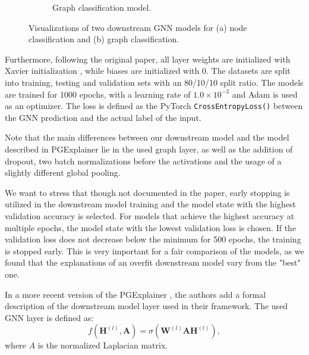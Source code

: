 \begin{figure}[htbp]
\begin{subfigure}[t]{0.48\textwidth}
\begin{tikzpicture}
        \end{tikzpicture}
        \caption{Graph classification model.}
        \label{fig:graph-classification}
    \end{subfigure}
    \caption{Visualizations of two downstream GNN models for (a) node classification and (b) graph classification.}
    \label{fig:gnn-models}
\end{figure}

Furthermore, following the original paper, all layer weights are initialized with Xavier initialization \cite{glorot2010understanding}, while biases are initialized with $0$. The datasets are split into training, testing and validation sets with an 80/10/10 split ratio. The models are trained for 1000 epochs, with a learning rate of $1.0 \times 10^{-3}$ and Adam \cite{kingma2014adam} is used as an optimizer. The loss is defined as the PyTorch \lstinline|CrossEntropyLoss()| between the GNN prediction and the actual label of the input. \bigskip

Note that the main differences between our downstream model and the model described in PGExplainer \cite{luo2020parameterized} lie in the used graph layer, as well as the addition of dropout, two batch normalizations before the activations and the usage of a slightly different global pooling.

We want to stress that though not documented in the paper, early stopping is utilized in the downstream model training and the model state with the highest validation accuracy is selected. For models that achieve the highest accuracy at multiple epochs, the model state with the lowest validation loss is chosen. If the validation loss does not decrease below the minimum for 500 epochs, the training is stopped early. This is very important for a fair comparison of the models, as we found that the explanations of an overfit downstream model vary from the "best" one.\bigskip

In a more recent version of the PGExplainer \cite{10423141}, the authors add a formal description of the downstream model layer used in their framework. The used GNN layer is defined as:
\begin{equation}
    f(\mathbf{H}^{(l)},\mathbf{A})=\sigma(\mathbf{W}^{(l)}\mathbf{A}\mathbf{H}^{(l)}),
\end{equation}
where $A$ is the normalized Laplacian matrix.

